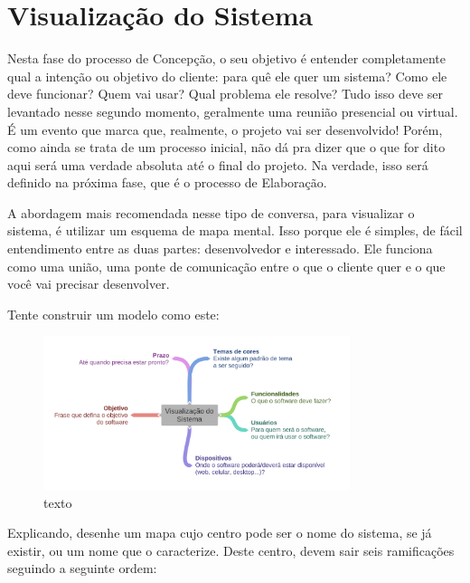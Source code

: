 \documentclass[a4paper, 12pt, oneside]{book}
\begin{document}
\section*{Visualização do Sistema}

Nesta fase do processo de Concepção, o seu objetivo é entender completamente qual a intenção ou objetivo do cliente: para quê ele quer um sistema? Como ele deve funcionar? Quem vai usar? Qual problema ele resolve? Tudo isso deve ser levantado nesse segundo momento, geralmente uma reunião presencial ou virtual. É um evento que marca que, realmente, o projeto vai ser desenvolvido! Porém, como ainda se trata de um processo inicial, não dá pra dizer que o que for dito aqui será uma verdade absoluta até o final do projeto. Na verdade, isso será definido na próxima fase, que é o processo de Elaboração.

A abordagem mais recomendada nesse tipo de conversa, para visualizar o sistema, é utilizar um esquema de mapa mental. Isso porque ele é simples, de fácil entendimento entre as duas partes: desenvolvedor e interessado. Ele funciona como uma união, uma ponte de comunicação entre o que o cliente quer e o que você vai precisar desenvolver.

Tente construir um modelo como este:

\begin{figure}[H]
	\caption{texto}
	\centering
	\includegraphics[width=0.8\textwidth]{Visualizao_do_Sistema.png}
\end{figure}

Explicando, desenhe um mapa cujo centro pode ser o nome do sistema, se já existir, ou um nome que o caracterize. Deste centro, devem sair seis ramificações seguindo a seguinte ordem:
\end{document}
